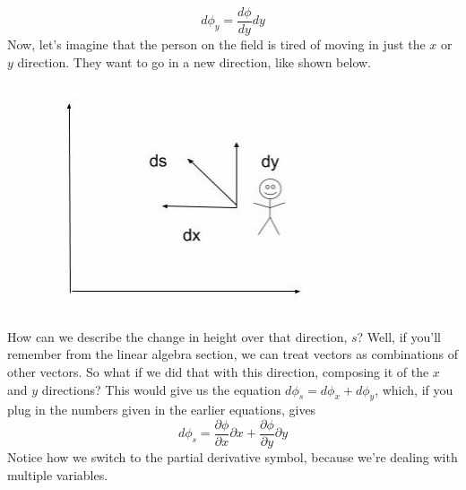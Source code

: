 \begin{equation*}
d\phi_y=\frac{d\phi}{dy}dy
\end{equation*}
Now, let's imagine that the person on the field is tired of moving in just the $x$ or $y$ direction. They want to go in a new direction, like shown below.
\begin{figure}[H]
\includegraphics[scale=0.5]{sdir.jpg}
\end{figure}
How can we describe the change in height over that direction, $s$? Well, if you'll remember from the linear algebra section, we can treat vectors as combinations of other vectors. So what if we did that with this direction, composing it of the $x$ and $y$ directions?
This would give us the equation $d\phi_s=d\phi_x+d\phi_y$, which, if you plug in the numbers given in the earlier equations, gives
\begin{equation*}
d\phi_s=\frac{\partial\phi}{\partial x}\partial x+\frac{\partial\phi}{\partial y}\partial y
\end{equation*}
Notice how we switch to the partial derivative symbol, because we're dealing with multiple variables.
